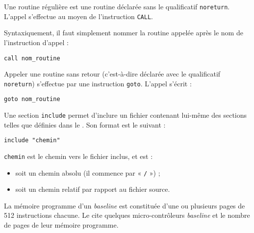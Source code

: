 Une routine régulière est une routine déclarée sans le qualificatif \texttt{noreturn}. L'appel s’effectue au moyen de l'instruction \texttt{CALL}.

Syntaxiquement, il faut simplement nommer la routine appelée après le nom de l’instruction d’appel :

\begin{lstlisting}[language=piccolo]
call nom_routine
\end{lstlisting}





Appeler une routine sans retour (c'est-à-dire déclarée avec le qualificatif \texttt{noreturn}) s'effectue par une instruction \texttt{goto}. L'appel s'écrit :
\begin{lstlisting}[language=piccolo]
goto nom_routine
\end{lstlisting}





Une section \texttt{include} permet d'inclure un fichier contenant lui-même des sections telles que définies dans le .  Son format est le suivant :

\begin{lstlisting}[language=piccolo]
  include "chemin"
\end{lstlisting}

\texttt{chemin} est le chemin vers le fichier inclus, et est :
\begin{itemize}
  \item soit un chemin absolu (il commence par « \texttt{/} ») ;
  \item soit un chemin relatif par rapport au fichier source.
\end{itemize}


La mémoire programme d'un \emph{baseline} est constituée d'une ou plusieurs pages de 512 instructions chacune. Le  cite quelques micro-contrôleurs \emph{baseline} et le nombre de pages de leur mémoire programme.

